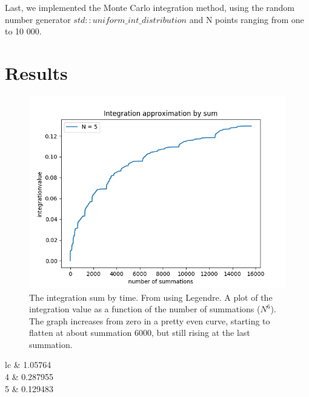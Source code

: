 \documentclass{emulateapj}
\begin{document}
	Last, we implemented the Monte Carlo integration method, using the random number generator $std::uniform\_int\_distribution$ and N points ranging from one to 10 000.
	
	\section{Results}
	\label{sec:results}
	
	\begin{figure}
		\centering
		\includegraphics[scale=0.6]{Figur00.png}
		\caption{The integration sum by time. From using Legendre. A plot of the integration value as a function of the number of summations ($N^6$). The graph increases from zero in a pretty even curve, starting to flatten at about summation $6000$, but still rising at the last summation.}
		\label{fig:legint}
	\end{figure}
	
	\begin{deluxetable}{lc}
		\tablewidth{200pt}
		 & 1.05764 \\
		4 & 0.287955 \\
		5 & 0.129483
		\enddata
	\end{deluxetable}
	
\end{document}
